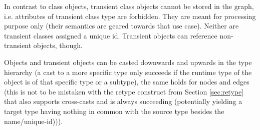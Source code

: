In contrast to class objects, transient class objects cannot be stored in the graph, i.e. attributes of transient class type are forbidden.
They are meant for processing purpose only (their semantics are geared towards that use case).
Neither are transient classes assigned a unique id.
Transient objects can reference non-transient objects, though.

Objects and transient objects can be casted downwards and upwards in the type hierarchy (a cast to a more specific type only succeeds if the runtime type of the object is of that specific type or a subtype), the same holds for nodes and edges (this is not to be mistaken with the retype construct from Section \ref{sec:retype} that also supports cross-casts and is always succeeding (potentially yielding a target type having nothing in common with the source type besides the name/unique-id))).

